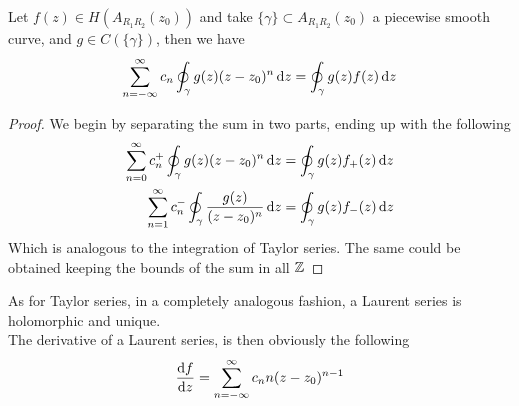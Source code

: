 \documentclass[../complete.tex]{subfiles}
\begin{document}
\begin{thm}
	Let $f(z)\in H\left(A_{R_1R_2}(z_0)\right)$ and take $\{\gamma\}\subset A_{R_1R_2}(z_0)$ a piecewise smooth curve, and $g\in C(\{\gamma\})$, then we have
	\begin{equation*}
		\sum_{n=-\infty}^\infty c_n\oint_\gamma g(z)(z-z_0)^n\operatorname{d\!} z=\oint_\gamma g(z)f(z)\operatorname{d\!} z
	\end{equation*}
\end{thm}
\begin{proof}
	We begin by separating the sum in two parts, ending up with the following
	\begin{equation*}
		\begin{aligned}
			\sum_{n=0}^\infty c_n^+\oint_\gamma g(z)(z-z_0)^n\operatorname{d\!} z&=\oint_\gamma g(z)f_+(z)\operatorname{d\!} z\\
			\sum_{n=1}^\infty c_n^-\oint_\gamma \frac{g(z)}{(z-z_0)^n}\operatorname{d\!} z&=\oint_\gamma g(z)f_-(z)\operatorname{d\!} z
		\end{aligned}
	\end{equation*}
	Which is analogous to the integration of Taylor series. The same could be obtained keeping the bounds of the sum in all $\mathbb{Z}$
\end{proof}
As for Taylor series, in a completely analogous fashion, a Laurent series is holomorphic and unique.\\
The derivative of a Laurent series, is then obviously the following
\begin{equation*}
	\derivative{f}{z}=\sum_{n=-\infty}^{\infty}c_nn(z-z_0)^{n-1}
\end{equation*}
\end{document}

